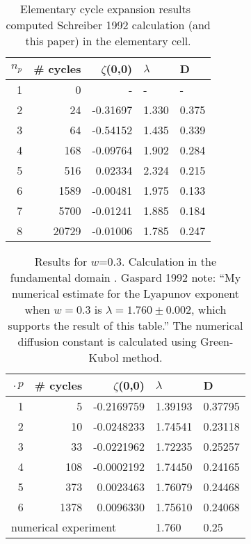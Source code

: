
\begin{table}[htbp]
	\centering
	\begin{tabular}{|r|r|r|l|l|}
		\hline
		${n_p}$ & \# cycles & $\zeta$(0,0) & $\lambda$ & D \\
		\hline\hline
		1      & 0      &   -    &   -  &   - \\
		2      & 24     & -0.31697 & 1.330 & 0.375\\
		3      & 64     & -0.54152 & 1.435 & 0.339\\
		4      & 168    & -0.09764 & 1.902 & 0.284\\
		5      & 516    &  0.02334 & 2.324 & 0.215\\
		6      & 1589   & -0.00481 & 1.975 & 0.133\\
		7      & 5700   & -0.01241 & 1.885 & 0.184\\
		8      & 20729  & -0.01006 & 1.785 & 0.247\\ \hline
	\end{tabular}
	\caption[Elementary cell cycle expansion results of diffusion
	coefficient]{\label{TCELL1}
		Elementary cycle expansion results~ computed
		Schreiber 1992 calculation (and this paper) in the
		elementary cell.}
\end{table}


\begin{table}[htbp]
	\centering
	\begin{tabular}{|r|r|r|l|l|}
		\hline
		$\period{p}$ & \# cycles & $\zeta$(0,0) & $\lambda$ & D \\
		\hline\hline
		1      & 5      & -0.2169759 & 1.39193 & 0.37795 \\
		2      & 10     & -0.0248233 & 1.74541 & 0.23118 \\
		3      & 33     & -0.0221962 & 1.72235 & 0.25257 \\
		4      & 108    & -0.0002192 & 1.74450 & 0.24165 \\
		5      & 373    &  0.0023463 & 1.76079 & 0.24468 \\
		6      & 1378   &  0.0096330 & 1.75610 & 0.24068 \\
		\hline\hline
		\multicolumn{3}{|l|}{numerical experiment}
		& 1.760   & 0.25
		\\ \hline
	\end{tabular}
	\caption[Fundamental domain cycle expansion results of diffusion
	coefficient]{\label{TCELL2}
		Results for $w$=0.3. Calculation in the fundamental domain .
		Gaspard
		1992 note: ``My
		numerical estimate for the Lyapunov exponent when $w=0.3$ is
		$\lambda = 1.760 \pm 0.002$, which supports the result of this
		table.'' The numerical diffusion constant is calculated
		using
		Green-Kubol method.
	}
\end{table}



